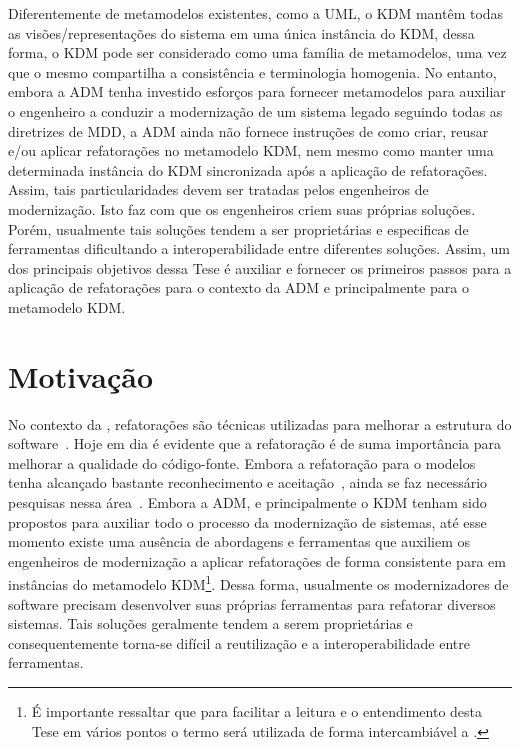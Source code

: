 Diferentemente de metamodelos existentes, como a UML, o KDM mantêm todas as visões/representações do sistema em uma única instância do KDM, dessa forma, o KDM pode ser considerado como uma família de metamodelos, uma vez que o mesmo compartilha a consistência e terminologia homogenia. No entanto, embora a ADM tenha investido esforços para fornecer metamodelos para auxiliar o engenheiro a conduzir a modernização de um sistema legado seguindo todas as diretrizes de MDD, a ADM ainda não fornece instruções de como criar, reusar e/ou aplicar refatorações no metamodelo KDM, nem mesmo como manter uma determinada instância do KDM sincronizada após a aplicação de refatorações. Assim, tais particularidades devem ser tratadas pelos engenheiros de modernização. Isto faz com que os engenheiros criem suas próprias soluções. Porém, usualmente tais soluções tendem a ser proprietárias e especificas de ferramentas dificultando a interoperabilidade entre diferentes soluções. Assim, um dos principais objetivos dessa Tese é auxiliar e fornecer os primeiros passos para a aplicação de refatorações para o contexto da ADM e principalmente para o metamodelo KDM.



\section{Motivação}\label{sec:justificativa_e_motivacao}

No contexto da , refatorações são técnicas utilizadas para melhorar a estrutura do software~\cite{Fowler1999}. Hoje em dia é evidente que a refatoração é de suma importância para melhorar a qualidade do código-fonte. Embora a refatoração para o modelos tenha alcançado bastante reconhecimento e aceitação~\cite{Salem_2008, Gorp, Egyed_2008, Briand_2006, staron2004implementing}, ainda se faz necessário pesquisas nessa área~\cite{revisao_sistematica_uml_refactoring, durelli_systematic_mapping}. %
%
Embora a ADM, e principalmente o KDM tenham sido propostos para auxiliar todo o processo da modernização de sistemas, até esse momento existe uma ausência de abordagens e ferramentas que auxiliem os engenheiros de modernização a aplicar refatorações de forma consistente para em instâncias do metamodelo KDM\footnote{É importante ressaltar que para facilitar a leitura e o entendimento  desta Tese em vários pontos o termo  será utilizada de forma intercambiável a .}. Dessa forma, usualmente os modernizadores de software precisam desenvolver suas próprias ferramentas para refatorar diversos sistemas. Tais soluções geralmente tendem a serem proprietárias e consequentemente torna-se difícil a reutilização e a interoperabilidade entre ferramentas.


